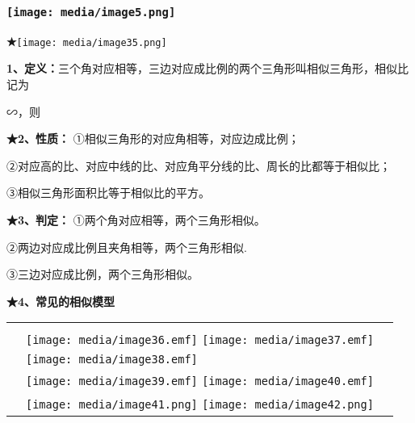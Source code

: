\documentclass[a4paper,11pt,UTF8]{ctexart}
\begin{document}
\hypertarget{ux5b66ux79d1ux7f51www.zxxk.com--ux6559ux80b2ux8d44ux6e90ux95e8ux6237ux63d0ux4f9bux8bd5ux9898ux8bd5ux5377ux6559ux6848ux8bfeux4ef6ux6559ux5b66ux8bbaux6587ux7d20ux6750ux7b49ux5404ux7c7bux6559ux5b66ux8d44ux6e90ux5e93ux4e0bux8f7dux8fd8ux6709ux5927ux91cfux4e30ux5bccux7684ux6559ux5b66ux8d44ux8baf-11}{%
\subsubsection{\texorpdfstring{\protect\texttt{[image: media/image5.png]}}{学科网(www.zxxk.com)-\/-教育资源门户，提供试题试卷、教案、课件、教学论文、素材等各类教学资源库下载，还有大量丰富的教学资讯！}}\label{ux5b66ux79d1ux7f51www.zxxk.com--ux6559ux80b2ux8d44ux6e90ux95e8ux6237ux63d0ux4f9bux8bd5ux9898ux8bd5ux5377ux6559ux6848ux8bfeux4ef6ux6559ux5b66ux8bbaux6587ux7d20ux6750ux7b49ux5404ux7c7bux6559ux5b66ux8d44ux6e90ux5e93ux4e0bux8f7dux8fd8ux6709ux5927ux91cfux4e30ux5bccux7684ux6559ux5b66ux8d44ux8baf-11}}

\textbf{★}\texttt{[image: media/image35.png]}

\textbf{1、定义：}三个角对应相等，三边对应成比例的两个三角形叫相似三角形，相似比记为

∽，则

\textbf{★2、性质：} ①相似三角形的对应角相等，对应边成比例；

②对应高的比、对应中线的比、对应角平分线的比、周长的比都等于相似比；

③相似三角形面积比等于相似比的平方。

\textbf{★3、判定：} ①两个角对应相等，两个三角形相似。

②两边对应成比例且夹角相等，两个三角形相似.

③三边对应成比例，两个三角形相似。

\textbf{★4、常见的相似模型}

\begin{longtable}[]{@{}lll@{}}
\toprule
\endhead
& &\tabularnewline
& \texttt{[image: media/image36.emf]}
\texttt{[image: media/image37.emf]}
&\tabularnewline
& \texttt{[image: media/image38.emf]}
&\tabularnewline
& \texttt{[image: media/image39.emf]}
\texttt{[image: media/image40.emf]}
&\tabularnewline
& \texttt{[image: media/image41.png]}
\texttt{[image: media/image42.png]}
&\tabularnewline
\bottomrule
\end{longtable}
\end{document}

